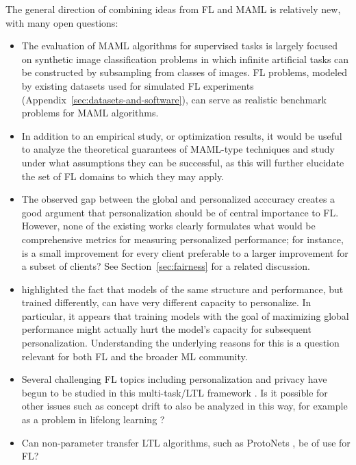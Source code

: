 \documentclass[11pt]{article}
\begin{document}
The general direction of combining ideas from FL and MAML is relatively new, with many open questions:
\begin{itemize}
	\item The evaluation of MAML algorithms for supervised tasks is largely focused on synthetic image classification problems \citep{lake11omniglot,ravi17miniimagenet} in which infinite artificial tasks can be constructed by subsampling from classes of images. FL problems, modeled by existing datasets used for simulated FL experiments (Appendix~\ref{sec:datasets-and-software}), can serve as realistic benchmark problems for MAML algorithms.
	\item In addition to an empirical study, or optimization results, it would be useful to analyze the theoretical guarantees of MAML-type techniques and study under what assumptions they can be successful, as this will further elucidate the set of FL domains to which they may apply.
	\item The observed gap between the global and personalized acccuracy \citep{jiang2019improving} creates a good argument that personalization should be of central importance to FL. However, none of the existing works clearly formulates what would be comprehensive metrics for measuring personalized performance; for instance, is a small improvement for every client preferable to a larger improvement for a subset of clients? See Section~\ref{sec:fairness} for a related discussion.
	\item \citet{jiang2019improving} highlighted the fact that models of the same structure and performance, but trained differently, can have very different capacity to personalize. In particular, it appears that training models with the goal of maximizing global performance might actually hurt the model's capacity for subsequent personalization. Understanding the underlying reasons for this is a question relevant for both FL and the broader ML community.
	\item Several challenging FL topics including personalization and privacy have begun to be studied in this multi-task/LTL framework \cite{khodak19adaptive,jiang2019improving,li19dpmeta}. Is it possible for other issues such as concept drift to also be analyzed in this way, for example as a problem in lifelong learning \citep{silver13lifelong}?
	\item Can non-parameter transfer LTL algorithms, such as ProtoNets \citep{snell17protonets}, be of use for FL?
\end{itemize}
\end{document}
